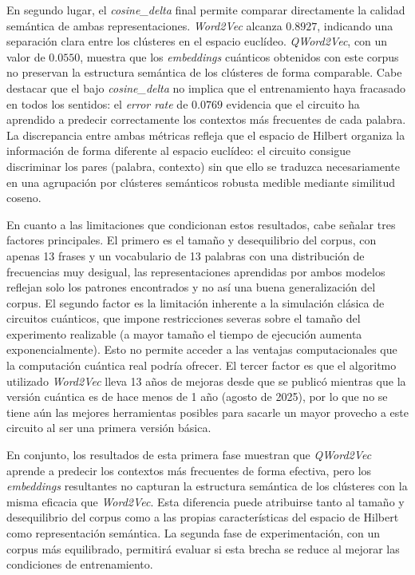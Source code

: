 En segundo lugar, el \textit{cosine\_delta} final permite comparar directamente la calidad semántica de ambas representaciones. \textit{Word2Vec} alcanza $0.8927$, indicando una separación clara entre los clústeres en el espacio euclídeo. \textit{QWord2Vec}, con un valor de $0.0550$, muestra que los \textit{embeddings} cuánticos obtenidos con este corpus no preservan la estructura semántica de los clústeres de forma comparable. Cabe destacar que el bajo \textit{cosine\_delta} no implica que el entrenamiento haya fracasado en todos los sentidos: el \textit{error rate} de $0.0769$ evidencia que el circuito ha aprendido a predecir correctamente los contextos más frecuentes de cada palabra. La discrepancia entre ambas métricas refleja que el espacio de Hilbert organiza la información de forma diferente al espacio euclídeo: el circuito consigue discriminar los pares (palabra, contexto) sin que ello se traduzca necesariamente en una agrupación por clústeres semánticos robusta medible mediante similitud coseno.

En cuanto a las limitaciones que condicionan estos resultados, cabe señalar tres factores principales. El primero es el tamaño y desequilibrio del corpus, con apenas 13 frases y un vocabulario de 13 palabras con una distribución de frecuencias muy desigual, las representaciones aprendidas por ambos modelos reflejan solo los patrones encontrados y no así una buena generalización del corpus. El segundo factor es la limitación inherente a la simulación clásica de circuitos cuánticos, que impone restricciones severas sobre el tamaño del experimento realizable (a mayor tamaño el tiempo de ejecución aumenta exponencialmente). Esto no permite acceder a las ventajas computacionales que la computación cuántica real podría ofrecer. El tercer factor es que el algoritmo utilizado \textit{Word2Vec} lleva 13 años de mejoras desde que se publicó mientras que la versión cuántica es de hace menos de 1 año (agosto de 2025), por lo que no se tiene aún las mejores herramientas posibles para sacarle un mayor provecho a este circuito al ser una primera versión básica.

En conjunto, los resultados de esta primera fase muestran que \textit{QWord2Vec} aprende a predecir los contextos más frecuentes de forma efectiva, pero los \textit{embeddings} resultantes no capturan la estructura semántica de los clústeres con la misma eficacia que \textit{Word2Vec}. Esta diferencia puede atribuirse tanto al tamaño y desequilibrio del corpus como a las propias características del espacio de Hilbert como representación semántica. La segunda fase de experimentación, con un corpus más equilibrado, permitirá evaluar si esta brecha se reduce al mejorar las condiciones de entrenamiento.


